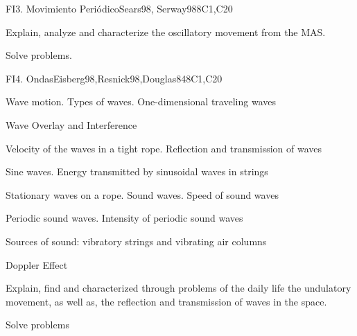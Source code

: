 \begin{syllabus}
\begin{unit}{FI3. Movimiento Periódico}{}{Sears98, Serway98}{8}{C1,C20}
   \begin{learningoutcomes}
         \item  Explain, analyze and characterize the oscillatory movement from the MAS.
         \item  Solve problems.
   \end{learningoutcomes}
\end{unit}

\begin{unit}{FI4. Ondas}{}{Eisberg98,Resnick98,Douglas84}{8}{C1,C20}
\begin{topics}
         \item  Wave motion. Types of waves. One-dimensional traveling waves
	 \item  Wave Overlay and Interference
         \item  Velocity of the waves in a tight rope. Reflection and transmission of waves
	 \item  Sine waves. Energy transmitted by sinusoidal waves in strings
         \item  Stationary waves on a rope. Sound waves. Speed of sound waves
	 \item  Periodic sound waves. Intensity of periodic sound waves
	 \item  Sources of sound: vibratory strings and vibrating air columns
	 \item  Doppler Effect
   \end{topics}

   \begin{learningoutcomes}
         \item  Explain, find and characterized  through problems of the daily life the undulatory movement, as well as, the reflection and transmission of waves in the space.
         \item  Solve problems
   \end{learningoutcomes}
\end{unit}


\end{syllabus}
